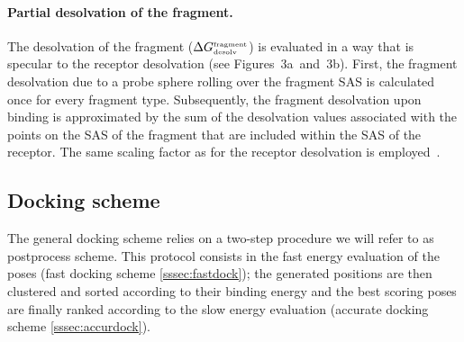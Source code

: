 \documentclass[a4paper,12pt,titlepage]{article}
\begin{document}
\paragraph{Partial desolvation of the fragment.}

The desolvation of the fragment 
($\Delta G^{\mbox{\tiny fragment}}_{\mbox{\tiny desolv}}$) 
is evaluated in a way that is specular to the 
receptor desolvation (see Figures~3a~and~3b). First, the fragment desolvation 
due to a probe sphere rolling over the fragment SAS is calculated once for 
every fragment type. Subsequently, the fragment desolvation upon binding is 
approximated by the sum of the desolvation values associated with the points 
on the SAS of the fragment that are included within the SAS of the receptor. 
The same scaling factor as for the receptor desolvation is employed~\cite{Majeux:Efficient}. 


\subsection{Docking scheme}
\label{ssec:Docking}


The general docking scheme relies on a two-step procedure we will refer to as postprocess scheme.
This protocol consists in the fast energy evaluation of the poses (fast docking scheme \ref{sssec:fastdock}); the generated positions are then clustered and sorted according to their binding energy and the best scoring poses are finally ranked according to the slow energy evaluation (accurate docking scheme \ref{sssec:accurdock}). 
\end{document}
